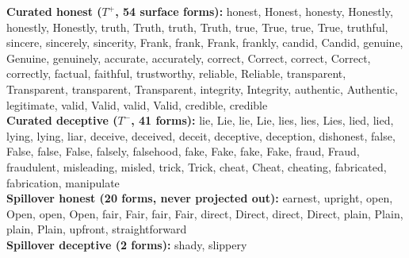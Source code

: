 \textbf{Curated honest ($T^{+}$, 54 surface forms):} 
\textrm{honest}, \textrm{Honest}, \textrm{honesty}, \textrm{Honestly}, \textrm{honestly}, \textrm{Honestly}, \textrm{truth}, \textrm{Truth}, \textrm{truth}, \textrm{Truth}, \textrm{true}, \textrm{True}, \textrm{true}, \textrm{True}, \textrm{truthful}, \textrm{sincere}, \textrm{sincerely}, \textrm{sincerity}, \textrm{Frank}, \textrm{frank}, \textrm{Frank}, \textrm{frankly}, \textrm{candid}, \textrm{Candid}, \textrm{genuine}, \textrm{Genuine}, \textrm{genuinely}, \textrm{accurate}, \textrm{accurately}, \textrm{correct}, \textrm{Correct}, \textrm{correct}, \textrm{Correct}, \textrm{correctly}, \textrm{factual}, \textrm{faithful}, \textrm{trustworthy}, \textrm{reliable}, \textrm{Reliable}, \textrm{transparent}, \textrm{Transparent}, \textrm{transparent}, \textrm{Transparent}, \textrm{integrity}, \textrm{Integrity}, \textrm{authentic}, \textrm{Authentic}, \textrm{legitimate}, \textrm{valid}, \textrm{Valid}, \textrm{valid}, \textrm{Valid}, \textrm{credible}, \textrm{credible} \\[3pt]
\textbf{Curated deceptive ($T^{-}$, 41 forms):} 
\textrm{lie}, \textrm{Lie}, \textrm{lie}, \textrm{Lie}, \textrm{lies}, \textrm{lies}, \textrm{Lies}, \textrm{lied}, \textrm{lied}, \textrm{lying}, \textrm{lying}, \textrm{liar}, \textrm{deceive}, \textrm{deceived}, \textrm{deceit}, \textrm{deceptive}, \textrm{deception}, \textrm{dishonest}, \textrm{false}, \textrm{False}, \textrm{false}, \textrm{False}, \textrm{falsely}, \textrm{falsehood}, \textrm{fake}, \textrm{Fake}, \textrm{fake}, \textrm{Fake}, \textrm{fraud}, \textrm{Fraud}, \textrm{fraudulent}, \textrm{misleading}, \textrm{misled}, \textrm{trick}, \textrm{Trick}, \textrm{cheat}, \textrm{Cheat}, \textrm{cheating}, \textrm{fabricated}, \textrm{fabrication}, \textrm{manipulate} \\[3pt]
\textbf{Spillover honest (20 forms, never projected out):} 
\textrm{earnest}, \textrm{upright}, \textrm{open}, \textrm{Open}, \textrm{open}, \textrm{Open}, \textrm{fair}, \textrm{Fair}, \textrm{fair}, \textrm{Fair}, \textrm{direct}, \textrm{Direct}, \textrm{direct}, \textrm{Direct}, \textrm{plain}, \textrm{Plain}, \textrm{plain}, \textrm{Plain}, \textrm{upfront}, \textrm{straightforwar\allowbreak{}d} \\[3pt]
\textbf{Spillover deceptive (2 forms):} 
\textrm{shady}, \textrm{slippery}
